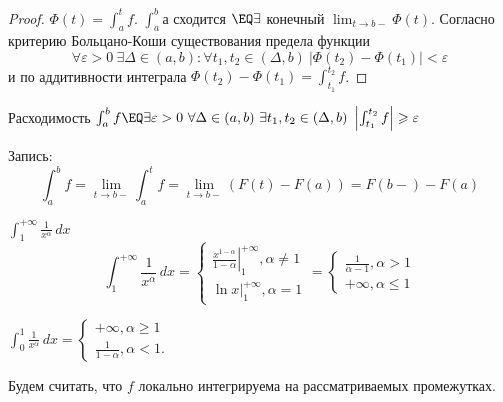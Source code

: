 \begin{proof}
	$\Phi (t) = \int_a^t f$. $\int_a^b а$ сходится $\EQ \exists$ конечный $\lim_{t \to b-} \Phi (t)$.
	Согласно критерию Больцано-Коши существования предела функции
	\[\forall \varepsilon > 0 \ \exists \Delta \in (a, b) : \forall t_1, t_2 \in (\Delta, b) \ |\Phi(t_2) - \Phi(t_1)| < \varepsilon\]
	и по аддитивности интеграла $\Phi(t_2) - \Phi(t_1) = \int_{t_1}^{t_2} f$.
\end{proof}

\begin{Rem}
	Расходимость $\int_a^b f \EQ \exists \varepsilon > 0 \ \forall \Delta \in (a, b) \ \exists t_1, t_2 \in (\Delta, b) \ \left| \int_{t_1}^{t_2} f\right| \geqslant \varepsilon$
\end{Rem}

\begin{Rem}
	Запись:
	\[\int_a^b f = \lim_{t \to b-}\int_a^t f = \lim_{t \to b-} (F(t) - F(a)) = F(b-) - F(a)\]
\end{Rem}

\begin{Example}
	$\int_1^{+\infty} \frac{1}{x^{\alpha}} \, dx$
	\[\int_1^{+\infty} \frac{1}{x^\alpha}\,dx = \begin{cases}
		\left.\frac{x^{1 - \alpha}}{1 - \alpha}\right|_{1}^{+\infty}, \alpha \neq 1 \\
		\left.\ln x\right|_1^{+\infty}, \alpha = 1
	\end{cases} = \begin{cases}
		\frac{1}{\alpha - 1}, \alpha > 1 \\
		+\infty, \alpha \leqslant 1
	\end{cases}\] 
\end{Example}

\begin{Example}
	$\int_0^1 \frac{1}{x^\alpha} \,dx = \begin{cases}
		+\infty, \alpha \geqslant 1 \\
		\frac{1}{1 - \alpha}, \alpha < 1.
	\end{cases}$ 
\end{Example}


Будем считать, что $f$ локально интегрируема на рассматриваемых промежутках.

